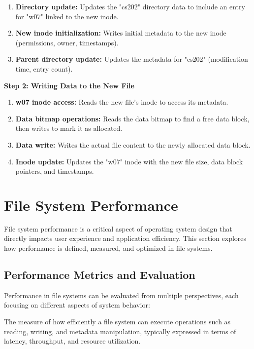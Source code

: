 \documentclass[../../compsys.tex]{subfiles}
\begin{document}
\begin{example}
\begin{enumerate}
    \item \textbf{Directory update:} Updates the "cs202" directory data to include an entry for "w07" linked to the new inode.
    
    \item \textbf{New inode initialization:} Writes initial metadata to the new inode (permissions, owner, timestamps).
    
    \item \textbf{Parent directory update:} Updates the metadata for "cs202" (modification time, entry count).
\end{enumerate}

\textbf{Step 2: Writing Data to the New File}
\begin{enumerate}
    \item \textbf{w07 inode access:} Reads the new file's inode to access its metadata.
    
    \item \textbf{Data bitmap operations:} Reads the data bitmap to find a free data block, then writes to mark it as allocated.
    
    \item \textbf{Data write:} Writes the actual file content to the newly allocated data block.
    
    \item \textbf{Inode update:} Updates the "w07" inode with the new file size, data block pointers, and timestamps.
\end{enumerate}
\end{example}
\newpage
\section{File System Performance}

File system performance is a critical aspect of operating system design that directly impacts user experience and application efficiency. This section explores how performance is defined, measured, and optimized in file systems.

\subsection{Performance Metrics and Evaluation}

Performance in file systems can be evaluated from multiple perspectives, each focusing on different aspects of system behavior:

\begin{definition}
The measure of how efficiently a file system can execute operations such as reading, writing, and metadata manipulation, typically expressed in terms of latency, throughput, and resource utilization.
\end{definition}
\end{document}
